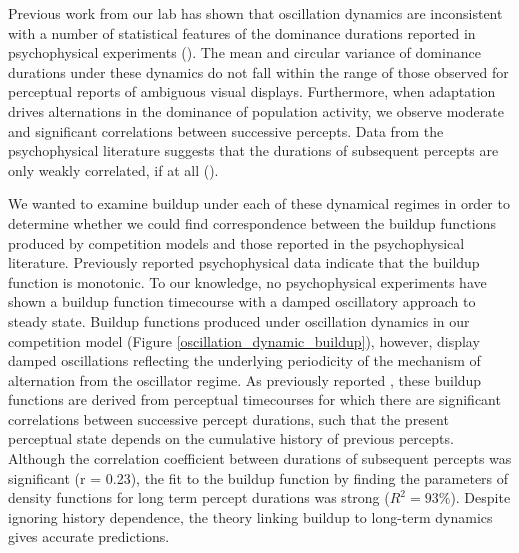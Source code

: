Previous work from our lab has shown that oscillation dynamics are inconsistent with a number of statistical features of the dominance durations reported in psychophysical experiments (\cite{Shpiro2009}). The mean and circular variance of dominance durations under these dynamics do not fall within the range of those observed for perceptual reports of ambiguous visual displays. Furthermore, when adaptation drives alternations in the dominance of population activity, we observe moderate and significant correlations between successive percepts. Data from the psychophysical literature suggests that the durations of subsequent percepts are only weakly correlated, if at all (\cite{Pressnitzer2006}).

We wanted to examine buildup under each of these dynamical regimes in order to determine whether we could find correspondence between the buildup functions produced by competition models and those reported in the psychophysical literature. Previously reported psychophysical data indicate that the buildup function is monotonic. To our knowledge, no psychophysical experiments have shown a buildup function timecourse with a damped oscillatory approach to steady state. Buildup functions produced under oscillation dynamics in our competition model (Figure \ref{oscillation_dynamic_buildup}), however, display damped oscillations reflecting the underlying periodicity of the mechanism of alternation from the oscillator regime. As previously reported \cite{Shpiro2009}, these buildup functions are derived from perceptual timecourses for which there are significant correlations between successive percept durations, such that the present perceptual state depends on the cumulative history of previous percepts. Although the correlation coefficient between durations of subsequent percepts was significant (r = 0.23), the fit to the buildup function by finding the parameters of density functions for long term percept durations was strong ($R^2 = 93\%$). Despite ignoring history dependence, the theory linking buildup to long-term dynamics gives accurate predictions. 


